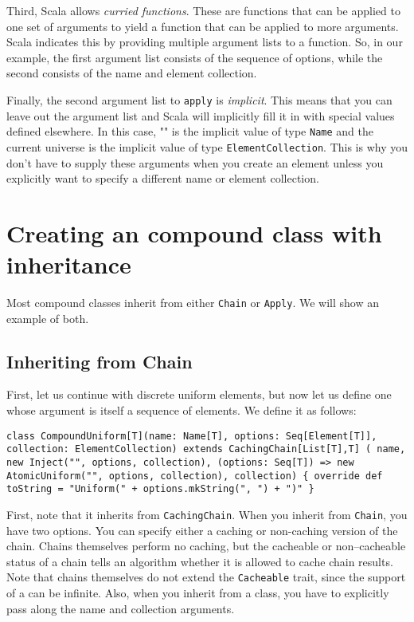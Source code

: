 Third, Scala allows \emph{curried functions}. These are functions that can be applied to one set of arguments to yield a function that can be applied to more arguments. Scala indicates this by providing multiple argument lists to a function. So, in our example, the first argument list consists of the sequence of options, while the second consists of the name and element collection.

Finally, the second argument list to \texttt{apply} is \emph{implicit}. This means that you can leave out the argument list and Scala will implicitly fill it in with special values defined elsewhere. In this case, "" is the implicit value of type \texttt{Name} and the current universe is the implicit value of type \texttt{ElementCollection}. This is why you don't have to supply these arguments when you create an element unless you explicitly want to specify a different name or element collection.

\section{Creating an compound class with inheritance}

Most compound classes inherit from either \texttt{Chain} or \texttt{Apply}. We will show an example of both.

\subsection{Inheriting from Chain}

First, let us continue with discrete uniform elements, but now let us define one whose argument is itself a sequence of elements. We define it as follows:

\begin{flushleft}
\texttt{class CompoundUniform[T](name: Name[T], options: Seq[Element[T]], 
\newline collection: ElementCollection) extends CachingChain[List[T],T] (
name,
\newline \tab new Inject("", options, collection),
\newline \tab (options: Seq[T]) => new AtomicUniform("", options, collection),
collection) \{
\newline \tab override def toString = "Uniform(" + options.mkString(", ") + ")"
\newline \}
}
\end{flushleft}

First, note that it inherits from \texttt{CachingChain}. When you inherit from \texttt{Chain}, you have two options. You can specify either a caching or non-caching version of the chain. Chains themselves perform no caching, but the cacheable or non--cacheable status of a chain tells an algorithm whether it is allowed to cache chain results. Note that chains themselves do not extend the \texttt{Cacheable} trait, since the support of a can be infinite. Also, when you inherit from a class, you have to explicitly pass along the name and collection arguments.


